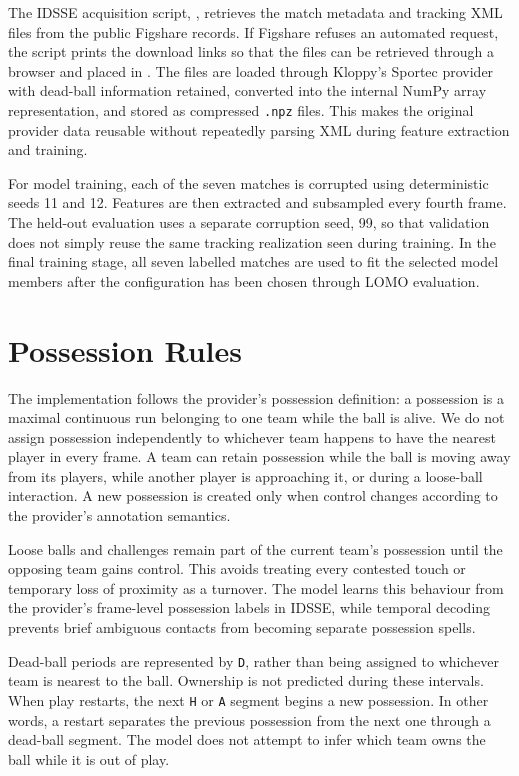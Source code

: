 \documentclass[11pt,a4paper]{article}
\begin{document}
The IDSSE acquisition script, , retrieves the match metadata and tracking XML files from the public Figshare records. If Figshare refuses an automated request, the script prints the download links so that the files can be retrieved through a browser and placed in . The files are loaded through Kloppy's Sportec provider with dead-ball information retained, converted into the internal NumPy array representation, and stored as compressed \texttt{.npz} files. This makes the original provider data reusable without repeatedly parsing XML during feature extraction and training.

For model training, each of the seven matches is corrupted using deterministic seeds 11 and 12. Features are then extracted and subsampled every fourth frame. The held-out evaluation uses a separate corruption seed, 99, so that validation does not simply reuse the same tracking realization seen during training. In the final training stage, all seven labelled matches are used to fit the selected model members after the configuration has been chosen through LOMO evaluation.


\section{Possession Rules}

The implementation follows the provider's possession definition: a possession is a maximal continuous run belonging to one team while the ball is alive. We do not assign possession independently to whichever team happens to have the nearest player in every frame. A team can retain possession while the ball is moving away from its players, while another player is approaching it, or during a loose-ball interaction. A new possession is created only when control changes according to the provider's annotation semantics.

Loose balls and challenges remain part of the current team's possession until the opposing team gains control. This avoids treating every contested touch or temporary loss of proximity as a turnover. The model learns this behaviour from the provider's frame-level possession labels in IDSSE, while temporal decoding prevents brief ambiguous contacts from becoming separate possession spells.

Dead-ball periods are represented by \texttt{D}, rather than being assigned to whichever team is nearest to the ball. Ownership is not predicted during these intervals. When play restarts, the next \texttt{H} or \texttt{A} segment begins a new possession. In other words, a restart separates the previous possession from the next one through a dead-ball segment. The model does not attempt to infer which team owns the ball while it is out of play.
\end{document}
